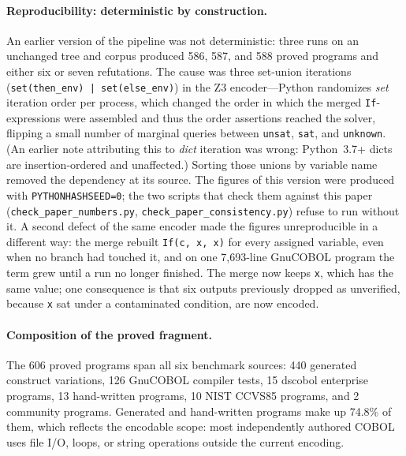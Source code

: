 \documentclass[sigconf,nonacm]{acmart}
\begin{document}
\paragraph{Reproducibility: deterministic by construction.} An earlier version of the pipeline was not deterministic: three runs on an unchanged tree and corpus produced 586, 587, and 588 proved programs and either six or seven refutations. The cause was three set-union iterations (\texttt{set(then\_env) | set(else\_env)}) in the Z3 encoder---Python randomizes \emph{set} iteration order per process, which changed the order in which the merged \texttt{If}-expressions were assembled and thus the order assertions reached the solver, flipping a small number of marginal queries between \texttt{unsat}, \texttt{sat}, and \texttt{unknown}. (An earlier note attributing this to \emph{dict} iteration was wrong: Python~3.7+ dicts are insertion-ordered and unaffected.) Sorting those unions by variable name removed the dependency at its source. The figures of this version were produced with \texttt{PYTHONHASHSEED=0}; the two scripts that check them against this paper (\texttt{check\_paper\_numbers.py}, \texttt{check\_paper\_consistency.py}) refuse to run without it. A second defect of the same encoder made the figures unreproducible in a different way: the merge rebuilt \texttt{If(c, x, x)} for every assigned variable, even when no branch had touched it, and on one 7{,}693-line GnuCOBOL program the term grew until a run no longer finished. The merge now keeps \texttt{x}, which has the same value; one consequence is that six outputs previously dropped as unverified, because \texttt{x} sat under a contaminated condition, are now encoded.

\paragraph{Composition of the proved fragment.} The 606 proved programs span all six benchmark sources: 440 generated construct variations, 126 GnuCOBOL compiler tests, 15 dscobol enterprise programs, 13 hand-written programs, 10 NIST CCVS85 programs, and 2 community programs. Generated and hand-written programs make up 74.8\% of them, which reflects the encodable scope: most independently authored COBOL uses file I/O, loops, or string operations outside the current encoding.
\end{document}
